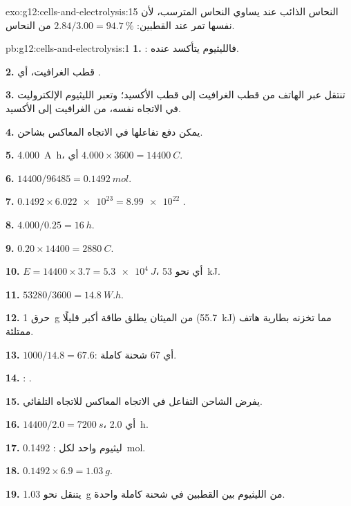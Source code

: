\begin{solution}{exo:g12:cells-and-electrolysis:15}
النحاس الذائب عند  يساوي النحاس المترسب، لأن 
نفسها تمر عند القطبين: $2.84/3.00 = \qty{94.7}{\percent}$ من النحاس.
\end{solution}

\begin{solution}{pb:g12:cells-and-electrolysis:1}
\textbf{1.} : فالليثيوم يتأكسد عنده.

\textbf{2.} قطب الغرافيت، أي .

\textbf{3.} تنتقل  عبر الهاتف من قطب الغرافيت إلى
قطب الأكسيد؛ وتعبر  الليثيوم الإلكتروليت في الاتجاه
نفسه، من الغرافيت إلى الأكسيد.

\textbf{4.} يمكن دفع تفاعلها في الاتجاه المعاكس بشاحن.

\textbf{5.} \qty{4.000}{A.h}، أي $4.000 \times 3600 =
\qty{14400}{C}$.

\textbf{6.} $14400/96485 = \qty{0.1492}{mol}$.

\textbf{7.} $0.1492 \times \num{6.022e23} = \num{8.99e22}$ .

\textbf{8.} $4.000/0.25 = \qty{16}{h}$.

\textbf{9.} $0.20 \times 14400 = \qty{2880}{C}$.

\textbf{10.} $E = 14400 \times 3.7 = \qty{5.3e4}{J}$، أي نحو \qty{53}{kJ}.

\textbf{11.} $53280/3600 = \qty{14.8}{W.h}$.

\textbf{12.} حرق \qty{1}{g} من الميثان يطلق طاقة أكبر قليلًا
(\qty{55.7}{kJ}) مما تخزنه بطارية هاتف ممتلئة.

\textbf{13.} $1000/14.8 = 67.6$: أي 67 شحنة كاملة.

\textbf{14.} : .

\textbf{15.} يفرض الشاحن التفاعل في الاتجاه المعاكس
للاتجاه التلقائي.

\textbf{16.} $14400/2.0 = \qty{7200}{s}$، أي \qty{2.0}{h}.

\textbf{17.}  ليثيوم واحد لكل : \qty{0.1492}{mol}.

\textbf{18.} $0.1492 \times 6.9 = \qty{1.03}{g}$.

\textbf{19.} يتنقل نحو \qty{1.03}{g} من الليثيوم بين
القطبين في شحنة كاملة واحدة.
\end{solution}

